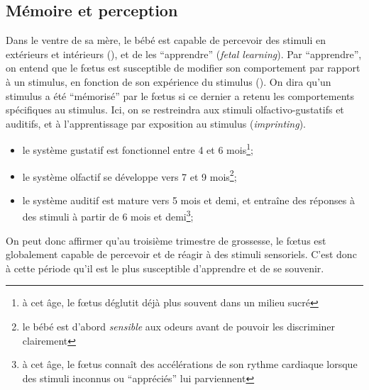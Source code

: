 \documentclass[french]{article}
\begin{document}
			\subsection{Mémoire et perception}\label{perception}
				Dans le ventre de sa mère, le bébé est capable de percevoir des stimuli en extérieurs et intérieurs (\cite{busnel2010}), et de les ``apprendre'' (\textit{fetal learning}). Par ``apprendre'', on entend que le fœtus est susceptible de modifier son comportement par rapport à un stimulus, en fonction de son expérience du stimulus (\cite{james2010}). On dira qu'un stimulus a été ``mémorisé'' par le fœtus si ce dernier a retenu  les comportements spécifiques au stimulus.  Ici, on se restreindra aux stimuli olfactivo-gustatifs et auditifs, et à l'apprentissage par exposition au stimulus (\textit{imprinting}).
				\begin{itemize}
					\item le système gustatif est fonctionnel entre 4 et 6 mois\footnote{à cet âge, le fœtus déglutit déjà plus souvent dans un milieu sucré};
					\item le système olfactif se développe vers 7 et 9 mois\footnote{le bébé est d'abord \textit{sensible} aux odeurs avant de pouvoir les discriminer clairement};
					\item le système auditif est mature vers 5 mois et demi, et entraîne des réponses à des stimuli à partir de 6 mois et demi\footnote{à cet âge, le fœtus connaît des accélérations de son rythme cardiaque lorsque des stimuli inconnus ou ``appréciés'' lui parviennent};
				\end{itemize}
				On peut donc affirmer qu'au troisième trimestre de grossesse, le fœtus est globalement capable de percevoir et de réagir à des stimuli sensoriels. C'est donc à cette période qu'il est le plus susceptible d'apprendre et de se souvenir.
			
\end{document}
